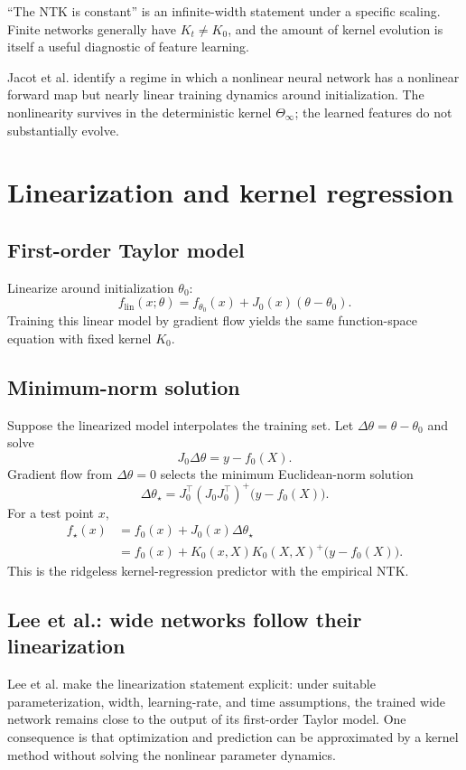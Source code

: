\documentclass[11pt,a4paper,oneside,openany]{memoir}
\theoremstyle{definition}
\begin{document}
\begin{warningbox}
``The NTK is constant'' is an infinite-width statement under a specific scaling.  Finite networks generally have $K_t\neq K_0$, and the amount of kernel evolution is itself a useful diagnostic of feature learning.
\end{warningbox}

\begin{presentbox}
Jacot et al. identify a regime in which a nonlinear neural network has a nonlinear forward map but nearly linear training dynamics around initialization.  The nonlinearity survives in the deterministic kernel $\Theta_\infty$; the learned features do not substantially evolve.
\end{presentbox}

\chapter{Linearization and kernel regression}
\section{First-order Taylor model}
Linearize around initialization $\theta_0$:
\[
f_{\mathrm{lin}}(x;\theta)
=f_{\theta_0}(x)+J_0(x)(\theta-\theta_0).
\]
Training this linear model by gradient flow yields the same function-space equation with fixed kernel $K_0$.

\section{Minimum-norm solution}
Suppose the linearized model interpolates the training set.  Let $\Delta\theta=\theta-\theta_0$ and solve
\[
J_0\Delta\theta=y-f_0(X).
\]
Gradient flow from $\Delta\theta=0$ selects the minimum Euclidean-norm solution
\[
\Delta\theta_\star
=J_0^\top(J_0J_0^\top)^+\bigl(y-f_0(X)\bigr).
\]
For a test point $x$,
\begin{align*}
f_\star(x)
&=f_0(x)+J_0(x)\Delta\theta_\star\\
&=f_0(x)+K_0(x,X)K_0(X,X)^+\bigl(y-f_0(X)\bigr).
\end{align*}
This is the ridgeless kernel-regression predictor with the empirical NTK.

\section{Lee et al.: wide networks follow their linearization}
Lee et al. make the linearization statement explicit: under suitable parameterization, width, learning-rate, and time assumptions, the trained wide network remains close to the output of its first-order Taylor model.  One consequence is that optimization and prediction can be approximated by a kernel method without solving the nonlinear parameter dynamics.
\end{document}
